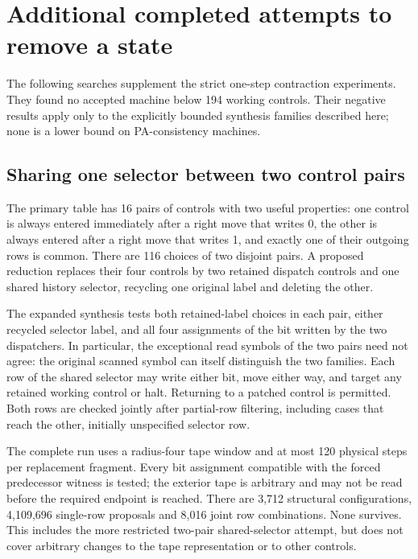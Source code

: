 \section{Additional completed attempts to remove a state}
\label{sec:additional-reductions}

The following searches supplement the strict one-step contraction experiments.
They found no accepted machine below 194 working controls. Their negative
results apply only to the explicitly bounded synthesis families described
here; none is a lower bound on PA-consistency machines.

\subsection{Sharing one selector between two control pairs}

The primary table has 16 pairs of controls with two useful properties:
one control is always entered immediately after a right move that writes 0,
the other is always entered after a right move that writes 1, and exactly
one of their outgoing rows is common. There are 116 choices of two disjoint
pairs. A proposed reduction replaces their four controls by two retained
dispatch controls and one shared history selector, recycling one original
label and deleting the other.

The expanded synthesis tests both retained-label choices in each pair,
either recycled selector label, and all four assignments of the bit written
by the two dispatchers. In particular, the exceptional read symbols of the
two pairs need not agree: the original scanned symbol can itself distinguish
the two families. Each row of the shared selector may write either bit,
move either way, and target any retained working control or halt. Returning
to a patched control is permitted. Both rows are checked jointly after
partial-row filtering, including cases that reach the other, initially
unspecified selector row.

The complete run uses a radius-four tape window and at most 120 physical
steps per replacement fragment. Every bit assignment compatible with the
forced predecessor witness is tested; the exterior tape is arbitrary and
may not be read before the required endpoint is reached. There are
3,712 structural configurations, 4,109,696 single-row proposals and 8,016
joint row combinations. None survives. This includes the more restricted
two-pair shared-selector attempt, but does not cover arbitrary changes to
the tape representation or to other controls.

